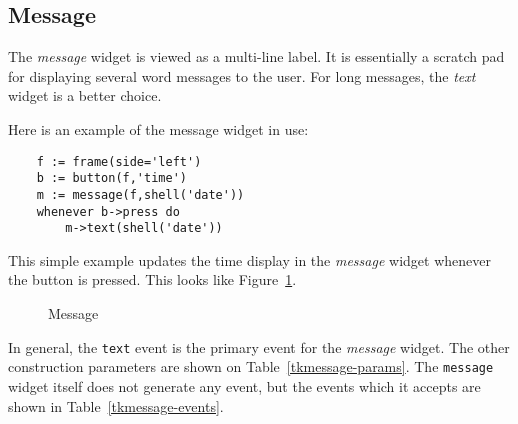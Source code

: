 \subsection{Message}
The {\em message} widget is viewed as a multi-line label. It is essentially a
scratch pad for displaying several word messages to the user. For long messages,
the {\em text} widget is a better choice.

Here is an example of the message widget in use:
\begin{verbatim}
    f := frame(side='left')
    b := button(f,'time')
    m := message(f,shell('date'))
    whenever b->press do
        m->text(shell('date'))
\end{verbatim}
This simple example updates the time display in the {\em message} widget whenever
the button is pressed. This looks like Figure~\ref{tkmessage}.
\begin{figure}[thb]
\centerline{}
\caption{ Message }
\label{tkmessage}
\end{figure}
In general, the {\tt text} event is the primary event for the {\em message} widget.
The other construction parameters are shown on Table~\ref{tkmessage-params}.
The {\tt message} widget itself does not generate any event, but the events which
it accepts are shown in Table~\ref{tkmessage-events}.

